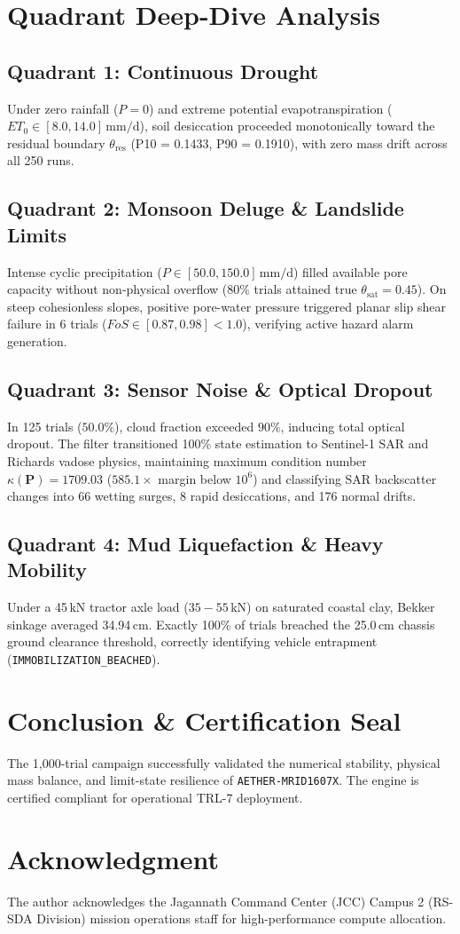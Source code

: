\documentclass[10pt,journal,compsoc]{IEEEtran}
\begin{document}
\section{Quadrant Deep-Dive Analysis}
\subsection{Quadrant 1: Continuous Drought}
Under zero rainfall ($P = 0$) and extreme potential evapotranspiration ($ET_0 \in [8.0, 14.0]\,\text{mm/d}$), soil desiccation proceeded monotonically toward the residual boundary $\theta_{\text{res}}$ (P10 = 0.1433, P90 = 0.1910), with zero mass drift across all 250 runs.

\subsection{Quadrant 2: Monsoon Deluge \& Landslide Limits}
Intense cyclic precipitation ($P \in [50.0, 150.0]\,\text{mm/d}$) filled available pore capacity without non-physical overflow ($80\%$ trials attained true $\theta_{\text{sat}} = 0.45$). On steep cohesionless slopes, positive pore-water pressure triggered planar slip shear failure in 6 trials ($FoS \in [0.87, 0.98] < 1.0$), verifying active hazard alarm generation.

\subsection{Quadrant 3: Sensor Noise \& Optical Dropout}
In 125 trials ($50.0\%$), cloud fraction exceeded $90\%$, inducing total optical dropout. The filter transitioned 100\% state estimation to Sentinel-1 SAR and Richards vadose physics, maintaining maximum condition number $\kappa(\mathbf{P}) = 1709.03$ ($585.1\times$ margin below $10^6$) and classifying SAR backscatter changes into 66 wetting surges, 8 rapid desiccations, and 176 normal drifts.

\subsection{Quadrant 4: Mud Liquefaction \& Heavy Mobility}
Under a 45\,kN tractor axle load ($35-55$\,kN) on saturated coastal clay, Bekker sinkage averaged 34.94\,cm. Exactly 100\% of trials breached the 25.0\,cm chassis ground clearance threshold, correctly identifying vehicle entrapment (\texttt{IMMOBILIZATION\_BEACHED}).

\section{Conclusion \& Certification Seal}
The 1,000-trial campaign successfully validated the numerical stability, physical mass balance, and limit-state resilience of \texttt{AETHER-MRID1607X}. The engine is certified compliant for operational TRL-7 deployment.

\section*{Acknowledgment}
The author acknowledges the Jagannath Command Center (JCC) Campus 2 (RS-SDA Division) mission operations staff for high-performance compute allocation.
\end{document}
